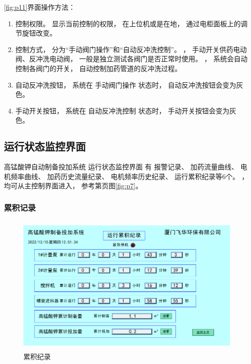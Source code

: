 \documentclass[UTF8,a4paper,12pt,titlepage]{ctexart}
\begin{document}
          \ref{fig:p11}界面操作方法：
              \begin{enumerate}
                 \item 控制权限。
                    显示当前控制的权限，
                    在上位机或是在地，
                    通过电柜面板上的调节旋钮改变。
                 \item 控制方式，
                     分为“手动阀门操作”和“自动反冲洗控制”。
                    ，
                    手动开关供药电动阀、反冲洗电动阀，
                    一般是独立测试各阀门是否正常时使用。
                    ，
                    系统会自动控制各阀门的开关，
                    自动控制加药管道的反冲洗过程。
                \item 自动反冲洗按钮，
                    系统在 手动阀门操作 状态时，
                    自动反冲洗按钮会变为灰色。
                \item 手动开关按钮，
                    系统在 自动反冲洗控制 状态时，
                    手动开关按钮会变为灰色。
            \end{enumerate}

    \subsection{运行状态监控界面}
        高锰酸钾自动制备投加系统 运行状态监控界面 有
          报警记录、
          加药流量曲线、
          电机频率曲线、
          加药历史流量纪录、
          电机频率历史纪录、
          运行累积纪录等6个。
        ，
        均可从主控制界面进入，
        参考第\pageref{sec:sg3}页图\ref{fig:p7}。

        \subsubsection{累积记录}
            \begin{figure}[h]
                \centering
                \includegraphics[height=7cm]{g22.PNG}
                \caption{累积纪录}\label{fig:p12}
            \end{figure}
            
\end{document}
